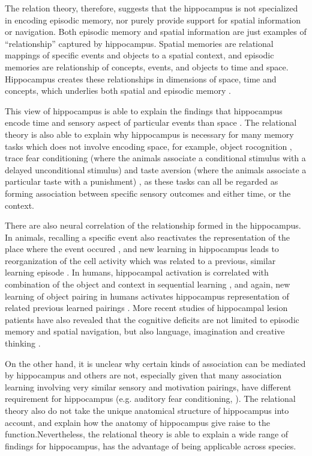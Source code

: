 The relation theory, therefore, suggests that the hippocampus is not specialized in encoding episodic memory, nor purely provide support for spatial information or navigation. Both episodic memory and spatial information are just examples of ``relationship'' captured by hippocampus. Spatial memories are relational mappings of specific events and objects to a spatial context, and episodic memories are relationship of concepts, events, and objects to time and space. Hippocampus creates these relationships in dimensions of space, time and concepts, which underlies both spatial and episodic memory \citep{
eichenbaum14}.

This view of hippocampus is able to explain the findings that hippocampus encode time and sensory aspect of particular events than space \citep{hampson93, young94, wood99, moser08}. The relational theory is also able to explain why hippocampus is necessary for many memory tasks which does not involve encoding space, for example, object rocognition \citep{eacott04, langston10}, trace fear conditioning (where the animals associate a conditional stimulus with a delayed unconditional stimulus) \citep{crestani02, mcechron98} and taste aversion (where the animals associate a particular taste with a punishment) \citep{best73, gallo95}, as these tasks can all be regarded as forming association between specific sensory outcomes and either time, or the context. 

There are also neural correlation of the relationship formed in the hippocampus. In animals, recalling a specific event also reactivates the representation of the place where the event occured \citep{moita03, itskov11}, and new learning in hippocampus leads to reorganization of the cell activity which was related to a previous, similar learning episode \citep{mckenzie13}. In humans, hippocampal activation is correlated with combination of the object and context in sequential learning \citep{hsieh14}, and again, new learning of object pairing in humans activates hippocampus representation of related previous learned pairings \citep{zeithamova12}. More recent studies of hippocampal lesion patients have also revealed that the cognitive deficits are not limited to episodic memory and spatial navigation, but also language, imagination and creative thinking \citep{duff09, duff13}.


On the other hand, it is unclear why certain kinds of association can be mediated by hippocampus and others are not, especially given that many association learning involving very similar sensory and motivation pairings, have different requirement for hippocampus (e.g. auditory fear conditioning, \citep{phillips92}). The relational theory also do not take the unique anatomical structure of hippocampus into account, and explain how the anatomy of hippocampus give raise to the function.Nevertheless, the relational theory is able to explain a wide range of findings for hippocampus, has the advantage of being applicable across species.


